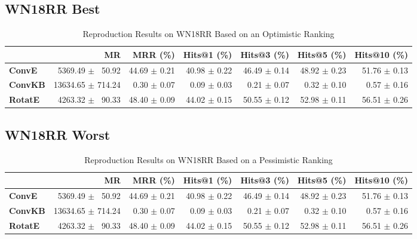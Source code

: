 \documentclass[journal]{IEEEtran}
\begin{document}
\subsection{WN18RR Best}
\begin{table*}
    \caption{Reproduction Results on WN18RR Based on an Optimistic Ranking}
    \label{tab:wn18rr_full_results_optimistic_ranking}
    \centering
    \begin{tabular}{lrrrrrr}
\toprule
{} &                 MR &      MRR (\%) &   Hits@1 (\%) &   Hits@3 (\%) &   Hits@5 (\%) &  Hits@10 (\%) \\
\midrule
\textbf{ConvE } &  $\phantom{5}$5369.49 $\pm$ $\phantom{5}$50.92 &  44.69 $\pm$ 0.21 &  40.98 $\pm$ 0.22 &  46.49 $\pm$ 0.14 &  48.92 $\pm$ 0.23 &  51.76 $\pm$ 0.13 \\
\textbf{ConvKB} &  13634.65 $\pm$ 714.24 &  $\phantom{5}$0.30 $\pm$ 0.07 &  $\phantom{5}$0.09 $\pm$ 0.03 &  $\phantom{5}$0.21 $\pm$ 0.07 &  $\phantom{5}$0.32 $\pm$ 0.10 &  $\phantom{5}$0.57 $\pm$ 0.16 \\
\textbf{RotatE} &  $\phantom{5}$4263.32 $\pm$ $\phantom{5}$90.33 &  48.40 $\pm$ 0.09 &  44.02 $\pm$ 0.15 &  50.55 $\pm$ 0.12 &  52.98 $\pm$ 0.11 &  56.51 $\pm$ 0.26 \\
\bottomrule
\end{tabular}

\end{table*}
\subsection{WN18RR Worst}
    \begin{table*}
        \caption{Reproduction Results on WN18RR Based on a Pessimistic Ranking}
        \label{tab:wn18rr_full_results_pessimistic_ranking}
        \centering
        \begin{tabular}{lrrrrrr}
\toprule
{} &                 MR &      MRR (\%) &   Hits@1 (\%) &   Hits@3 (\%) &   Hits@5 (\%) &  Hits@10 (\%) \\
\midrule
\textbf{ConvE } &  $\phantom{5}$5369.49 $\pm$ $\phantom{5}$50.92 &  44.69 $\pm$ 0.21 &  40.98 $\pm$ 0.22 &  46.49 $\pm$ 0.14 &  48.92 $\pm$ 0.23 &  51.76 $\pm$ 0.13 \\
\textbf{ConvKB} &  13634.65 $\pm$ 714.24 &  $\phantom{5}$0.30 $\pm$ 0.07 &  $\phantom{5}$0.09 $\pm$ 0.03 &  $\phantom{5}$0.21 $\pm$ 0.07 &  $\phantom{5}$0.32 $\pm$ 0.10 &  $\phantom{5}$0.57 $\pm$ 0.16 \\
\textbf{RotatE} &  $\phantom{5}$4263.32 $\pm$ $\phantom{5}$90.33 &  48.40 $\pm$ 0.09 &  44.02 $\pm$ 0.15 &  50.55 $\pm$ 0.12 &  52.98 $\pm$ 0.11 &  56.51 $\pm$ 0.26 \\
\bottomrule
\end{tabular}

    \end{table*}
\end{document}
